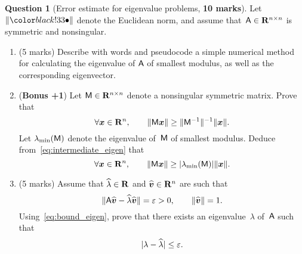 \documentclass[11pt]{article}
\theoremstyle{definition}
\newtheorem{question}{Question}
\begin{document}


\newpage
\begin{question}
    [Error estimate for eigenvalue problems, \textbf{10 marks}]
    Let $\norm{\placeholder}$ denote the Euclidean norm,
    and assume that~$\mathsf A \in \mathbf R^{n \times n}$ is symmetric and nonsingular.

    \begin{enumerate}
        \item
            (5 marks)
            Describe with words and pseudocode a simple numerical method for calculating the eigenvalue of $\mathsf A$ of smallest modulus,
            as well as the corresponding eigenvector.

        \item
            (\textbf{Bonus +1})
            Let $\mathsf M \in \mathbf R^{n \times n}$ denote a nonsingular symmetric matrix.
            Prove that
            \begin{equation}
                \label{eq:intermediate_eigen}
                \forall \mathbf{\boldsymbol{x}} \in \mathbf R^n, \qquad
                \lVert\mathsf M \mathbf{\boldsymbol{x}}\rVert \geq \lVert\mathsf M^{-1}\rVert^{-1} \lVert\mathbf{\boldsymbol{x}}\rVert.
            \end{equation}
            Let $\lambda_{\min}(\mathsf M)$ denote the eigenvalue of~$\mathsf M$ of smallest modulus.
            Deduce from~\eqref{eq:intermediate_eigen} that
            \begin{equation}
                \label{eq:bound_eigen}
                \forall \mathbf{\boldsymbol{x}} \in \mathbf R^n, \qquad
                \lVert\mathsf M \mathbf{\boldsymbol{x}}\rVert \geq \lvert\lambda_{\min}(\mathsf M)\rvert \lVert\mathbf{\boldsymbol{x}}\rVert.
            \end{equation}

        \item
            (5 marks)
            Assume that $\widehat \lambda \in \mathbf R$ and $\widehat{\mathbf{\boldsymbol{v}}} \in \mathbf R^n$ are such that
            \begin{equation}
                \label{eq:bound}
                \lVert\mathsf A \widehat{\mathbf{\boldsymbol{v}}} - \widehat{\lambda} \widehat{\mathbf{\boldsymbol{v}}}\rVert = \varepsilon > 0,
                \qquad \lVert\widehat {\mathbf{\boldsymbol{v}}}\rVert = 1.
            \end{equation}
            Using~\eqref{eq:bound_eigen},
            prove that there exists an eigenvalue~$\lambda$ of~$\mathsf A$ such that
            \[
                \lvert\lambda - \widehat \lambda\rvert \leq \varepsilon.
            \]


\end{enumerate}
\end{question}
\end{document}
